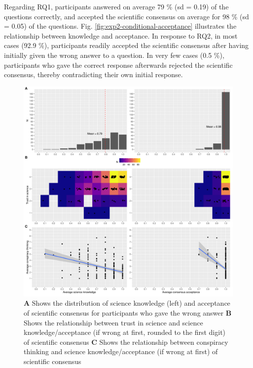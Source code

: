 \documentclass[
  doc,floatsintext]{apa6}
\begin{document}
Regarding RQ1, participants answered on average 79 \% (sd = 0.19) of the questions correctly, and accepted the scientific consensus on average for 98 \% (sd = 0.05) of the questions. Fig. \ref{fig:exp2-conditional-acceptance} illustrates the relationship between knowledge and acceptance. In response to RQ2, in most cases (92.9 \%), participants readily accepted the scientific consensus after having initially given the wrong answer to a question. In very few cases (0.5 \%), participants who gave the correct response afterwards rejected the scientific consensus, thereby contradicting their own initial response.



\begin{figure}
\centering
\includegraphics{output/figures/exp2-plot.pdf}
\caption{\label{fig:exp2-plot}\textbf{A} Shows the distribution of science knowledge (left) and acceptance of scientific consensus for participants who gave the wrong answer \textbf{B} Shows the relationship between trust in science and science knowledge/acceptance (if wrong at first, rounded to the first digit) of scientific consensus \textbf{C} Shows the relationship between conspiracy thinking and science knowledge/acceptance (if wrong at first) of scientific consensus}
\end{figure}
\end{document}
